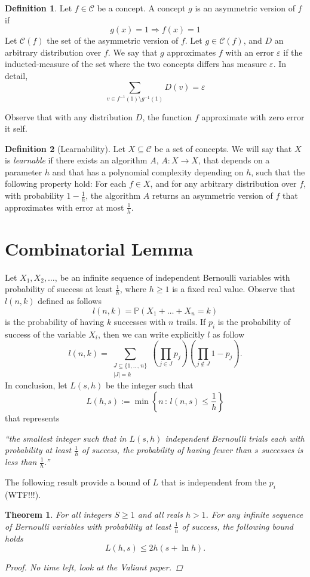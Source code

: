 \documentclass[a4paper,11pt]{article}
\newtheorem{thm}{Theorem}
\theoremstyle{definition}
\newtheorem{defn}{Definition}
\newcommand{\CC}{\mathcal{C}}
\newcommand{\Prob}{\mathbb{P}}
\begin{document}

\begin{defn}
  Let $f\in \CC$ be a concept. A concept $g$ is an asymmetric version
  of $f$ if
  \[
    g(x)=1 \Rightarrow f(x)=1
  \]
  Let $\CC(f)$ the set of the asymmetric version of $f$. Let
  $g\in\CC(f)$, and $D$ an arbitrary distribution over $f$. We say that $g$
  approximates $f$ with an error $\varepsilon$ if the inducted-measure of the set
  where the two concepts differs has measure $\varepsilon$. In detail,
  \[
    \sum_{v\in f^{-1}(1)\setminus g^{-1}(1)} D(v) = \varepsilon
  \]
\end{defn}
Observe that with any distribution $D$, the function $f$ approximate with
zero error it self.
\begin{defn}[Learnability]
  Let $X\subseteq\CC$ be a set of concepts. We will say that $X$ is \textit{learnable} if there
  exists an algorithm $A$, $A:X\to X$, that depends on a parameter $h$ and
  that has a polynomial complexity depending on $h$, such that the following
  property hold: For each $f\in X$, and for any arbitrary distribution over $f$,
  with probability $1-\frac 1 h$, the algorithm $A$ returns an asymmetric
  version of $f$ that approximates with error at most $\frac 1 h$.
\end{defn}


\section{Combinatorial Lemma}
Let $X_1,X_2,\dots$, be an infinite sequence of independent Bernoulli
variables with probability of success at least $\frac 1 h$, where $h\ge 1$ 
is a fixed real value. Observe that $l(n,k)$ defined as follows
\[
  l(n,k) = \Prob\left( X_1+\dots+X_n=k \right)
\]
is the probability of having $k$ successes with $n$ trails. If $p_i$ is the probability 
of success of the variable $X_i$, then we can write explicitly $l$ as follow
\[
  l(n,k) = \sum_{\substack{J\subseteq \{1,\dots,n\} \\ |J|=k}} 
  \left(\prod_{j\in J}p_{j}\right)
  \left(\prod_{j\not\in J}1 - p_{j}  \right).
\]
In conclusion, let $L(s,h)$ be the integer such that
\[
  L(h,s) :=\min\left\{ n\,:\, l(n,s)\le\frac 1 h \right\}
\]
that represents 
\begin{center}
  \it
  ``the smallest integer such that in $L(s,h)$ independent
Bernoulli trials each with probability at least $\frac 1 h$ of success, 
the probability of having fewer than $s$ successes is less than $\frac 1 h$.''
\end{center}
The following result provide a bound of $L$ that is independent from the
$p_i$ (WTF!!!).

\begin{thm} For all integers $S\ge 1$ and all reals $h>1$. For any infinite sequence
  of Bernoulli variables with probability at least $\frac 1 h$ of success,
  the following bound holds
  \[
    L(h,s) \le 2h\left( s+\ln h \right).
  \]
  \begin{proof}
    No time left, look at the Valiant paper.
  \end{proof}
\end{thm}
\end{document}
